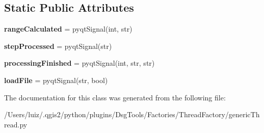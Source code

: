 \subsection*{Static Public Attributes}
\begin{DoxyCompactItemize}
\item 
\mbox{\label{class_dsg_tools_1_1_factories_1_1_thread_factory_1_1generic_thread_1_1_process_signals_a9beb475943ff5fcf3283a0f3bb1ac73a}} 
{\bfseries range\+Calculated} = pyqt\+Signal(int, str)
\item 
\mbox{\label{class_dsg_tools_1_1_factories_1_1_thread_factory_1_1generic_thread_1_1_process_signals_af4faf167ba8381ac7f073dc53341f60d}} 
{\bfseries step\+Processed} = pyqt\+Signal(str)
\item 
\mbox{\label{class_dsg_tools_1_1_factories_1_1_thread_factory_1_1generic_thread_1_1_process_signals_a9c826dc05db219e9ab5694325be64ef3}} 
{\bfseries processing\+Finished} = pyqt\+Signal(int, str, str)
\item 
\mbox{\label{class_dsg_tools_1_1_factories_1_1_thread_factory_1_1generic_thread_1_1_process_signals_a7780641beb8e8344dd10834ffde28b42}} 
{\bfseries load\+File} = pyqt\+Signal(str, bool)
\end{DoxyCompactItemize}


The documentation for this class was generated from the following file\+:\begin{DoxyCompactItemize}
\item 
/\+Users/luiz/.\+qgis2/python/plugins/\+Dsg\+Tools/\+Factories/\+Thread\+Factory/generic\+Thread.\+py\end{DoxyCompactItemize}
